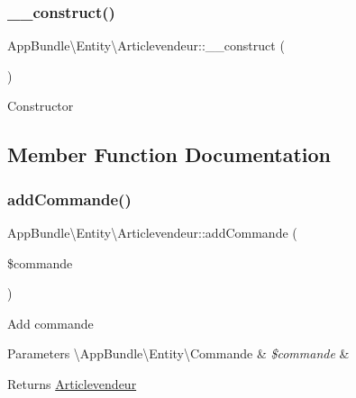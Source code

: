 \subsubsection{\texorpdfstring{\+\_\+\+\_\+construct()}{\_\_construct()}}
{\footnotesize\ttfamily App\+Bundle\textbackslash{}\+Entity\textbackslash{}\+Articlevendeur\+::\+\_\+\+\_\+construct (\begin{DoxyParamCaption}{ }\end{DoxyParamCaption})}

Constructor 

\subsection{Member Function Documentation}
\mbox{\label{class_app_bundle_1_1_entity_1_1_articlevendeur_a75bcaaf28b2db7788b35c2455b42b538}} 
\subsubsection{\texorpdfstring{add\+Commande()}{addCommande()}}
{\footnotesize\ttfamily App\+Bundle\textbackslash{}\+Entity\textbackslash{}\+Articlevendeur\+::add\+Commande (\begin{DoxyParamCaption}\item[{\textbackslash{}\hyperlink{class_app_bundle_1_1_entity_1_1_commande}{App\+Bundle\textbackslash{}\+Entity\textbackslash{}\+Commande}}]{\$commande }\end{DoxyParamCaption})}

Add commande


\begin{DoxyParams}[1]{Parameters}
\textbackslash{}\+App\+Bundle\textbackslash{}\+Entity\textbackslash{}\+Commande & {\em \$commande} & \\
\hline
\end{DoxyParams}
\begin{DoxyReturn}{Returns}
\hyperlink{class_app_bundle_1_1_entity_1_1_articlevendeur}{Articlevendeur} 
\end{DoxyReturn}
\mbox{\label{class_app_bundle_1_1_entity_1_1_articlevendeur_afb097e7bb2c8def7f442edb14a14c324}} 
